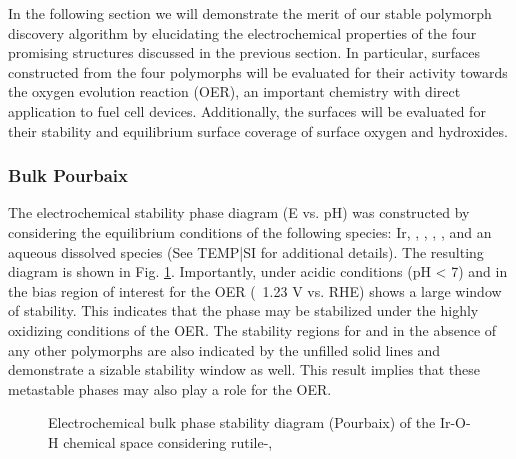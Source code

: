

In the following section we will demonstrate the merit of our stable polymorph discovery algorithm by elucidating the electrochemical properties of the four promising structures discussed in the previous section.
In particular, surfaces constructed from the four polymorphs will be evaluated for their activity towards the oxygen evolution reaction (OER), an important chemistry with direct application to fuel cell devices.
Additionally, the surfaces will be evaluated for their stability and equilibrium surface coverage of surface oxygen and hydroxides.

\subsubsection{Bulk Pourbaix}

The electrochemical stability phase diagram (E vs. pH) was constructed by considering the equilibrium conditions of the following species: Ir, \rIrOtwo, \aIrOthree, \rIrOthree, \bIrOthree, and an aqueous dissolved  species (See TEMP|SI for additional details).
The resulting diagram is shown in Fig. \ref{fig:bulk_pourbaix}.
Importantly, under acidic conditions (pH < 7) and in the bias region of interest for the OER (~1.23 V vs. RHE) \aIrOthree shows a large window of stability.
This indicates that the \aIrOthree phase may be stabilized under the highly oxidizing conditions of the OER.
The stability regions for \rIrOthree and \bIrOthree in the absence of any other  polymorphs are also indicated by the unfilled solid lines and demonstrate a sizable stability window as well.
This result implies that these metastable phases may also play a role for the OER.

\begin{figure}
\centering
{}
\caption{\label{fig:bulk_pourbaix}
Electrochemical bulk phase stability diagram (Pourbaix) of the Ir-O-H chemical space considering rutile-,
}
\end{figure}

